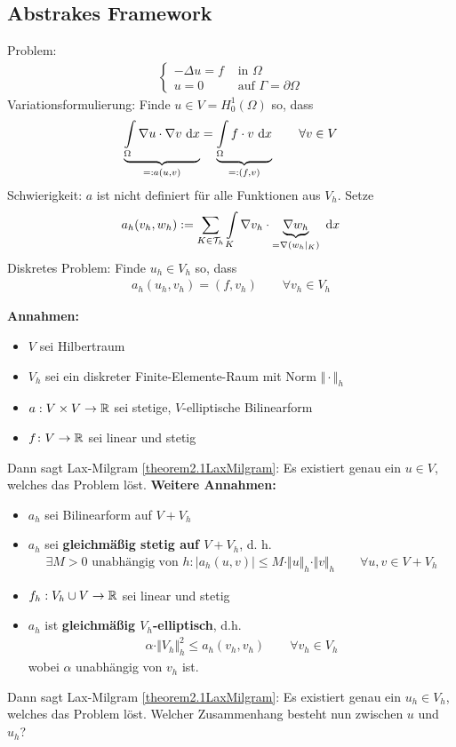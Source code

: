 \subsection{Abstrakes Framework}
Problem:
\begin{align*}
	\left\lbrace\begin{array}{rl}
		-\Delta u=f&\text{ in }\Omega\\
		u=0& \text{ auf }\Gamma=\partial\Omega
	\end{array}\right.
\end{align*}
Variationsformulierung: Finde $u\in V=H_0^1(\Omega)$ so, dass
\begin{align*}
	\underbrace{\int\limits_\Omega\nabla u\cdot\nabla v\text{ d} x}_{=:a(u,v)}=\underbrace{\int\limits_\Omega f\cdot v\text{ d} x}_{=:(f,v)}\qquad\forall v\in V
\end{align*}
Schwierigkeit: $a$ ist nicht definiert für alle Funktionen aus $V_h$. Setze
\begin{align*}
	a_h(v_h,w_h):=\sum\limits_{K\in\mathcal{T}_h}\int\limits_K\nabla v_h\cdot\underbrace{\nabla w_h}_{=\nabla(w_h|_K)}\text{ d} x
\end{align*}
Diskretes Problem: Finde $u_h\in V_h$ so, dass
\begin{align*}
	a_h(u_h,v_h)=(f,v_h)\qquad\forall v_h\in V_h
\end{align*}

\textbf{Annahmen:}
\begin{itemize}
	\item $V$ sei Hilbertraum
	\item $V_h$ sei ein diskreter Finite-Elemente-Raum mit Norm $\Vert\cdot\Vert_h$
	\item $a:V\times V\to\mathbb{R}$ sei stetige, $V$-elliptische Bilinearform  
	\item $f\colon V\to\mathbb{R}$ sei linear und stetig
\end{itemize}
Dann sagt Lax-Milgram \ref{theorem2.1LaxMilgram}: Es existiert genau ein $u\in V$, welches das Problem löst.\nl
\textbf{Weitere Annahmen:}
\begin{itemize}
	\item $a_h$ sei Bilinearform auf $V+ V_h$ %
	\item $a_h$ sei \textbf{gleichmäßig stetig auf $V+ V_h$}, d. h.
	\begin{align*}
		\exists M>0\text{ unabhängig von }h:\big|a_h(u,v)\big|\leq M\cdot\Vert u\Vert_h\cdot\Vert v\Vert_h\qquad\forall u,v\in V+ V_h
	\end{align*}
	\item $f_h:V_h\cup V\to\mathbb{R}$ sei linear und stetig
	\item $a_h$ ist \textbf{gleichmäßig $V_h$-elliptisch}, d.h.
	\begin{align*}
		\alpha\cdot\Vert V_h\Vert^2_h\leq a_h(v_h,v_h)\qquad\forall v_h\in V_h
	\end{align*}
	wobei $\alpha$ unabhängig von $v_h$ ist.
\end{itemize}
Dann sagt Lax-Milgram \ref{theorem2.1LaxMilgram}: Es existiert genau ein $u_h\in V_h$, welches das Problem löst. Welcher Zusammenhang besteht nun zwischen $u$ und $u_h$?

